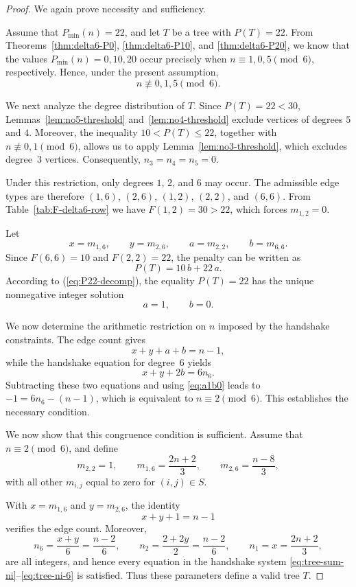 \documentclass[preprint,12pt]{elsarticle}
\begin{document}
\begin{proof}
We again prove necessity and sufficiency.

\medskip
Assume that $P_{\min}(n)=22$, and let $T$ be a tree with $P(T)=22$.
From Theorems~\ref{thm:delta6-P0}, \ref{thm:delta6-P10}, and
\ref{thm:delta6-P20}, we know that the values $P_{\min}(n)=0,10,20$ occur
precisely when $n\equiv 1,0,5\pmod 6$, respectively.
Hence, under the present assumption,
\[
n\not\equiv 0,1,5 \pmod 6.
\]

We next analyze the degree distribution of $T$.
Since $P(T)=22<30$, Lemmas~\ref{lem:no5-threshold} and~\ref{lem:no4-threshold}
exclude vertices of degrees $5$ and $4$.
Moreover, the inequality $10<P(T)\le 22$, together with
$n\not\equiv 0,1\pmod 6$, allows us to apply
Lemma~\ref{lem:no3-threshold}, which excludes degree~$3$ vertices.
Consequently, $n_3=n_4=n_5=0$.

Under this restriction, only degrees $1$, $2$, and $6$ may occur.
The admissible edge types are therefore $(1,6)$, $(2,6)$, $(1,2)$, $(2,2)$,
and $(6,6)$.
From Table~\ref{tab:F-delta6-row} we have $F(1,2)=30>22$, which forces $m_{1,2}=0$.


Let
\[
x=m_{1,6},\qquad
y=m_{2,6},\qquad
a=m_{2,2},\qquad
b=m_{6,6}.
\]
Since $F(6,6)=10$ and $F(2,2)=22$, the penalty can be written as
\begin{equation}
P(T)=10\,b+22\,a.
\label{eq:P22-decomp}
\end{equation}
According to (\ref{eq:P22-decomp}), the equality $P(T)=22$ has the unique nonnegative integer solution
\begin{equation}
a=1,\qquad b=0.
\label{eq:a1b0}
\end{equation}

We now determine the arithmetic restriction on $n$ imposed by the handshake
constraints.
The edge count gives
\[
x+y+a+b=n-1,
\]
while the handshake equation for degree~$6$ yields
\[
x+y+2b=6n_6.
\]
Subtracting these two equations and using \eqref{eq:a1b0} leads to $-1=6n_6-(n-1)$,
which is equivalent to
$n\equiv 2 \pmod 6$.
This establishes the necessary condition.

\medskip
We now show that this congruence condition is sufficient.
Assume that $n\equiv 2\pmod 6$, and define
\[
m_{2,2}=1,\qquad
m_{1,6}=\frac{2n+2}{3},\qquad
m_{2,6}=\frac{n-8}{3},
\]
with all other $m_{i,j}$ equal to zero for $(i,j)\in S$.

With $x=m_{1,6}$ and $y=m_{2,6}$, the identity
\[
x+y+1=n-1
\]
verifies the edge count.
Moreover,
\[
n_6=\frac{x+y}{6}=\frac{n-2}{6},\qquad
n_2=\frac{2+2y}{2}=\frac{n-2}{6},\qquad
n_1=x=\frac{2n+2}{3},
\]
are all integers, and hence every equation in the handshake system
\eqref{eq:tree-sum-ni}--\eqref{eq:tree-ni-6} is satisfied.
Thus these parameters define a valid tree $T$.


\end{proof}
\end{document}
